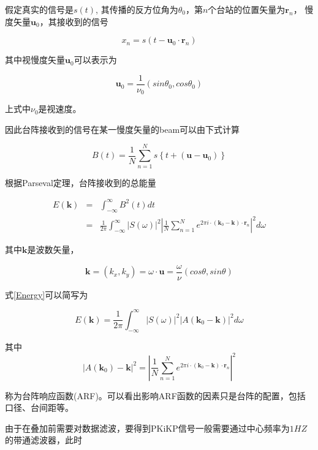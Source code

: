 假定真实的信号是$s(t)$, 其传播的反方位角为$\theta_0$，第$n$个台站的位置矢量为$\bm{r}_n$，
慢度矢量$\bm{u}_0$，其接收到的信号

\begin{equation}
x_n = s(t- \bm{u}_0 \cdot \bm{r}_n)
\end{equation}

其中视慢度矢量$\bm{u}_0$可以表示为

\begin{equation}
\bm{u}_0 = \frac{1}{\nu_0} (sin \theta_0, cos \theta_0)
\end{equation}

上式中$\nu_0$是视速度。

因此台阵接收到的信号在某一慢度矢量的beam可以由下式计算

\begin{equation}
B(t) = \frac{1}{N} \sum_{n=1}^{N} s\left\{ t + (\bm{u} - \bm{u}_0) \right\} 
\end{equation}

根据Parseval定理，台阵接收到的总能量

\begin{eqnarray}
E(\bm{k}) &=& \int_{-\infty}^{\infty} B^2 (t) dt \\
 &=& \frac{1}{2 \pi} \int_{-\infty}^{\infty}|S(\omega)|^2 %
\left |\frac{1}{N} \sum_{n=1}^{N} e^{2\pi i \cdot (\bm{k}_0 - \bm{k}) \cdot%
\bm{r}_n} \right|^2 d\omega
\label{Energy}
\end{eqnarray}

其中$\bm{k}$是波数矢量，

\begin{equation}
\bm{k} = (k_x,k_y) = \omega \cdot \bm{u} = \frac{\omega}{\nu} (cos\theta, %
sin \theta)
\end{equation}

式\eqref{Energy}可以简写为

\begin{equation}
E(\bm{k}) =  \frac{1}{2 \pi} \int_{-\infty}^{\infty}|S(\omega)|^2 %
|A(\bm{k}_0 - \bm{k})|^2 d \omega
\end{equation}

其中
\begin{equation}
|A(\bm{k}_0) - \bm{k}|^2 = \left |\frac{1}{N} \sum_{n=1}^{N} e^{2\pi i \cdot%
(\bm{k}_0 - \bm{k}) \cdot \bm{r}_n} \right|^2
\end{equation}

称为台阵响应函数(ARF)。可以看出影响ARF函数的因素只是台阵的配置，包括口径、台间距等。

由于在叠加前需要对数据滤波，要得到PKiKP信号一般需要通过中心频率为$1 HZ$的带通滤波器，此时

